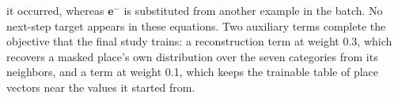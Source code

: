 it occurred, whereas $\mathbf{e}^{-}$ is substituted from another example in the
batch. No next-step target appears in these equations. Two auxiliary terms complete the
objective that the final study trains: a reconstruction term at weight 0.3, which
recovers a masked place's own distribution over the seven categories from its
neighbors, and a term at weight 0.1, which keeps the trainable table of place vectors
near the values it started from.

%


